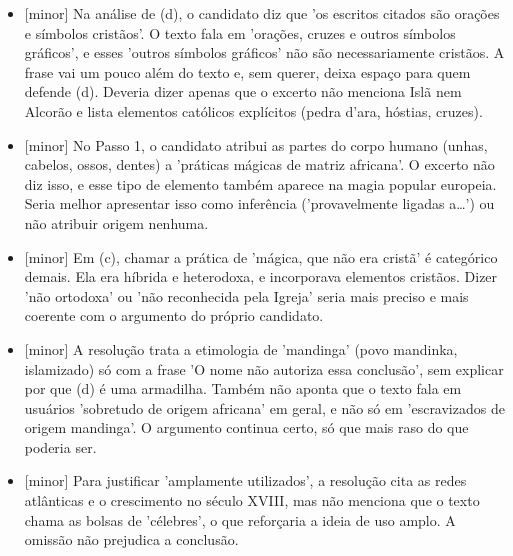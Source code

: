 \documentclass{article}%
\begin{document}
\begin{itemize}%
\item%
{[}minor{]} Na análise de (d), o candidato diz que 'os escritos citados são orações e símbolos cristãos'. O texto fala em 'orações, cruzes e outros símbolos gráficos', e esses 'outros símbolos gráficos' não são necessariamente cristãos. A frase vai um pouco além do texto e, sem querer, deixa espaço para quem defende (d). Deveria dizer apenas que o excerto não menciona Islã nem Alcorão e lista elementos católicos explícitos (pedra d'ara, hóstias, cruzes).%
\item%
{[}minor{]} No Passo 1, o candidato atribui as partes do corpo humano (unhas, cabelos, ossos, dentes) a 'práticas mágicas de matriz africana'. O excerto não diz isso, e esse tipo de elemento também aparece na magia popular europeia. Seria melhor apresentar isso como inferência ('provavelmente ligadas a\ldots{}') ou não atribuir origem nenhuma.%
\item%
{[}minor{]} Em (c), chamar a prática de 'mágica, que não era cristã' é categórico demais. Ela era híbrida e heterodoxa, e incorporava elementos cristãos. Dizer 'não ortodoxa' ou 'não reconhecida pela Igreja' seria mais preciso e mais coerente com o argumento do próprio candidato.%
\item%
{[}minor{]} A resolução trata a etimologia de 'mandinga' (povo mandinka, islamizado) só com a frase 'O nome não autoriza essa conclusão', sem explicar por que (d) é uma armadilha. Também não aponta que o texto fala em usuários 'sobretudo de origem africana' em geral, e não só em 'escravizados de origem mandinga'. O argumento continua certo, só que mais raso do que poderia ser.%
\item%
{[}minor{]} Para justificar 'amplamente utilizados', a resolução cita as redes atlânticas e o crescimento no século XVIII, mas não menciona que o texto chama as bolsas de 'célebres', o que reforçaria a ideia de uso amplo. A omissão não prejudica a conclusão.%
\end{itemize}%
\end{document}
